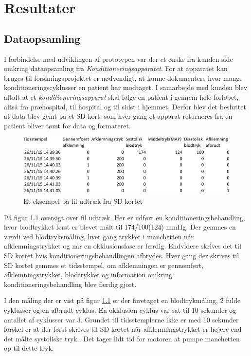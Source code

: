 \chapter{Resultater} \label{title:resultater}



\section{Dataopsamling}
I forbindelse med udviklingen af prototypen var der et ønske fra kunden side omkring dataopsamling fra \textit{Konditioneringsapparatet}. For at apparatet kan bruges til forskningsprojektet er nødvendigt, at kunne dokumentere hvor mange konditioneringscyklusser en patient har modtaget. I samarbejde med kunden blev aftalt at et \textit{konditioneringsapparat} skal følge en patient i gennem hele forløbet, altså fra præhospital, til hospital og til sidst i hjemmet. Derfor blev det besluttet at data blev gemt på et SD kort, som hver gang et apparat returneres fra en patient bliver tømt for data og formateret. 

\begin{figure}[H]
	\includegraphics[width = \textwidth]{billeder/fileksempel-crop.pdf}
	\caption{Et eksempel på fil udtræk fra SD kortet}\label{fig:fileksempel}
\end{figure}

På figur \ref{fig:fileksempel} oversigt over fil udtræk. Her er udført en konditioneringsbehandling, hvor blodtrykket først er blevet målt til 174/100(124) mmHg. Der gemmes en værdi ved blodtryksmåling, hver gang trykket i manchetten når afklemningstrykket og når en okklusionsfase er færdig. Endvidere skrives det til SD kortet hvis konditioneringsbehandlingen afbrydes. Hver gang der skrives til SD kortet gemmes et tidsstempel, om afklemningen er gennemført, afklemningstrykket, blodtrykket og information omkring konditioneringsbehandling blev færdig gjort. 

I den måling der er vist på figur \ref{fig:fileksempel} er der foretaget en blodtrykmåling, 2 fulde cyklusser og en afbrudt cyklus. En okklusion cyklus var sat til 10 sekunder og antallet af cyklusser var 3. Grundet til tidsstemplerne ikke er med 10 sekunder forskel er at der først skrives til SD kortet når afklemningstrykket er højere end det målte systoliske tryk.. Det tager lidt tid for motoren at pumpe manchetten op til dette tryk. 

